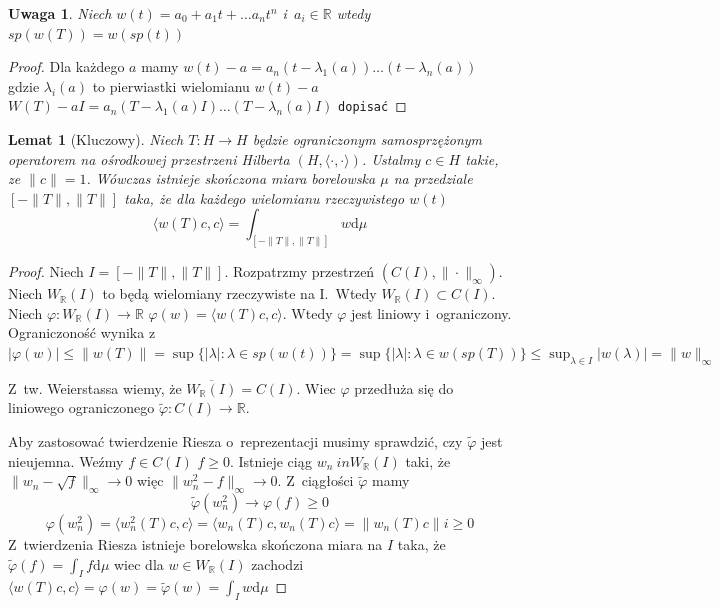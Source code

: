 \documentclass[11pt]{mwrep}
\renewcommand{\[}{\begin{equation}}
\renewcommand{\]}{\end{equation}}
\newcommand{\R}{{\ensuremath{\mathbb R}}}
\newcommand{\dd}{\mathrm{d}}
\newcommand{\scal}{\langle \cdot,\cdot \rangle}
\newtheorem{lem}[subsection]{Lemat}
\newtheorem{uwaga}[subsection]{Uwaga}
\begin{document}
\begin{uwaga}
	Niech $w(t) = a_0 + a_1 t +\ldots a_n t^n$ i~$a_i\in \R$ wtedy $sp(w(T)) = w (sp(t))$ 
\end{uwaga}
\begin{proof}
	Dla każdego $a$ mamy $w(t) - a = a_n (t - \lambda_1(a) )\ldots(t - \lambda_n(a))$ gdzie $\lambda_i(a)$ to pierwiastki wielomianu $w(t) -a$ 
	$W(T) - aI = a_n (T -\lambda_1(a)I) \ldots (T-\lambda_n(a) I)$
	\texttt{dopisać}
\end{proof}
\begin{lem}[Kluczowy]
	Niech $T\colon H \to H$ będzie ograniczonym samosprzężonym operatorem na ośrodkowej przestrzeni Hilberta $(H ,\scal)$.
	Ustalmy $c\in H$ takie, ze $\|c\| =1$. Wówczas istnieje skończona miara borelowska $\mu$ na przedziale $\left[ -\|T\|, \|T\| \right]$
	taka, że dla każdego wielomianu rzeczywistego $w(t)$ $$\langle w(T)c, c \rangle = \int_{\left[ -\|T\|, \|T\| \right]} w \dd \mu$$
\end{lem}
\begin{proof}
	Niech $I= \left[ -\|T\|,\|T\| \right]$. Rozpatrzmy przestrzeń $(C(I), \|\cdot\|_\infty)$.
	Niech $W_\R(I)$ to będą wielomiany rzeczywiste na I.~Wtedy $W_\R(I) \subset C(I)$.
	Niech $\varphi\colon W_\R(I) \to \R$ $\varphi(w) = \langle w(T)c,c \rangle$. 
	Wtedy $\varphi$ jest liniowy i~ograniczony. Ograniczoność wynika z~$|\varphi(w) | \le \|w(T)\| = \sup \{ |\lambda|: \lambda \in sp(w(t))\}
	=\sup\{ |\lambda|: \lambda \in w(sp(T))\}\le \sup_{\lambda \in I}|w(\lambda)| = \|w\|_\infty$ \par
	Z~tw. Weierstassa wiemy, że $\overline{W_\R (I)}  = C(I)$. Wiec $\varphi$ przedłuża się do liniowego ograniczonego $\tilde{\varphi}\colon C(I) \to \R$.\par
	Aby zastosować twierdzenie Riesza o~reprezentacji musimy sprawdzić, czy $\tilde{\varphi}$ jest nieujemna.
	Weźmy $f \in C(I)$ $f\ge0$.
	Istnieje ciąg $w_n \ in W_\R (I)$ taki, że $\|w_n - \sqrt{f}\|_{\infty}  \to 0$ więc $\|w_n^2 -f \|_{\infty}\to 0$.
	Z~ciągłości $\tilde{\varphi}$ mamy 
	$$\tilde{\varphi}(w_n^2)  \to \varphi(f) \ge 0$$
	$$\varphi(w_n^2) = \langle w_n^2 (T) c ,c \rangle = \langle w_n (T) c , w_n(T) c \rangle = \|w_n(T) c\|i \ge 0$$
	Z~twierdzenia Riesza istnieje borelowska skończona miara na $I$ taka, że $\tilde{\varphi}(f) = \int_I f \dd \mu$ 
	wiec dla $w \in W_\R (I)$ zachodzi $\langle w(T) c ,c  \rangle = \varphi(w) = \widetilde{\varphi}(w) = \int_I w \dd \mu$
\end{proof}
\end{document}
